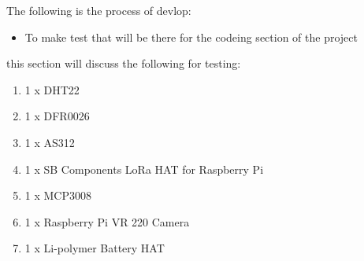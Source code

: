 The following is the process of devlop:
\begin{itemize}
    \item To make  test  that will be  there for  the  codeing  section of  the  project 
\end{itemize}
this section will discuss the  following for  testing:
\begin{enumerate}
    \item 1 x DHT22
    \item 1 x DFR0026
    \item 1 x AS312
    \item 1 x SB Components LoRa HAT for Raspberry Pi
    \item 1 x MCP3008
    \item 1 x Raspberry Pi VR 220 Camera
    \item  1 x Li-polymer Battery HAT 
\end{enumerate}
